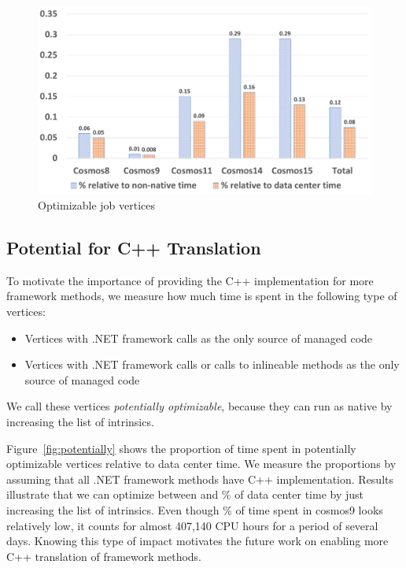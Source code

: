 \begin{figure}[ht]
\includegraphics[scale=0.8]{graphs/optimizable}
\caption{Optimizable job vertices}
\label{fig:optimizable}
\end{figure}

\subsection{Potential for C++ Translation}
To motivate the importance of providing the C++ implementation for more framework methods, we measure how much time is spent in the following type of vertices:
\begin{itemize}
\item Vertices with .NET framework calls as the only source of managed code
\item Vertices with .NET framework calls or calls to inlineable methods as the only source of managed code
\end{itemize}
We call these vertices \emph{potentially optimizable}, because they can run as native by increasing the list of intrinsics.

Figure~\ref{fig:potentially} shows the proportion of time spent in potentially optimizable vertices relative to data center time. 
We measure the proportions by assuming that all .NET framework methods have C++ implementation.
Results illustrate that we can optimize between \potentiallyOptimizableL{} and \potentiallyOptimizableU{} \% of data center time by just increasing the list of intrinsics. 
Even though \potentiallyOptimizableL{} \% of time spent in cosmos9 looks relatively low, it counts for almost 407,140 CPU hours for a period of several days. 
Knowing this type of impact motivates the future work on enabling more C++ translation of framework methods.

